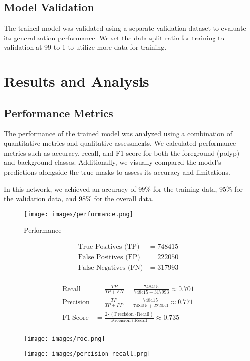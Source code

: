 \documentclass[12pt]{article}
\begin{document}
\subsection{Model Validation}
The trained model was validated using a separate validation dataset to evaluate its generalization performance. We set the data split ratio for training to validation at 99 to 1 to utilize more data for training.

\section{Results and Analysis}
\subsection{Performance Metrics}
The performance of the trained model was analyzed using a combination of quantitative metrics and qualitative assessments. We calculated performance metrics such as accuracy, recall, and F1 score for both the foreground (polyp) and background classes. Additionally, we visually compared the model's predictions alongside the true masks to assess its accuracy and limitations.

In this network, we achieved an accuracy of 99\% for the training data, 95\% for the validation data, and 98\% for the overall data.

\begin{figure}
    \centering
        \texttt{[image: images/performance.png]}
        \caption{Performance}
        \label{fig:performance}
\end{figure}


\begin{align*}
\text{True Positives (TP)} & = 748415 \\
\text{False Positives (FP)} & = 222050 \\
\text{False Negatives (FN)} & = 317993 \\
\end{align*}

\begin{align*}
\text{Recall} & = \frac{TP}{TP + FN} = \frac{748415}{748415 + 317993} \approx 0.701 \\
\text{Precision} & = \frac{TP}{TP + FP} = \frac{748415}{748415 + 222050} \approx 0.771 \\
\text{F1 Score} & = \frac{2 \cdot (\text{Precision} \cdot \text{Recall})}{\text{Precision} + \text{Recall}} \approx 0.735 \\
\end{align*}
\begin{figure}[ht]
    \centering
    \begin{minipage}{0.45\textwidth}
        \centering
        \texttt{[image: images/roc.png]}
    \end{minipage}
    \hfill
    \begin{minipage}{0.45\textwidth}
        \centering
        \texttt{[image: images/percision\_recall.png]}
    \end{minipage}
\end{figure}
\end{document}
